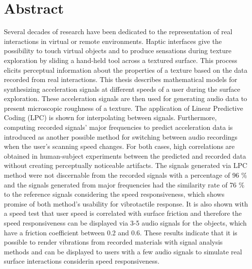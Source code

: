 
\thispagestyle{plain}

\section*{Abstract}


\switchlanguage{\lang} %
Several decades of research have been dedicated to the representation of real interactions in virtual or remote environments. Haptic interfaces give the possibility to touch virtual objects and to produce sensations during texture exploration by sliding a hand-held tool across a textured surface. This process elicits perceptual information about the properties of a texture based on the data recorded from real interactions. This thesis describes mathematical models for synthesizing acceleration signals at different speeds of a user during the surface exploration. These acceleration signals are then used for generating audio data to present microscopic roughness of a texture. The application of Linear Predictive Coding (LPC) is shown for interpolating between signals. Furthermore, computing recorded signals' major frequencies to predict acceleration data is introduced as another possible method for switching between audio recordings when the user's scanning speed changes. For both cases, high correlations are obtained in human-subject experiments between the predicted and recorded data without creating perceptually noticeable artifacts.  The signals generated via LPC method were not discernable from the recorded signals with a percentage of 96 \% and the signals generated from major frequencies had the similarity rate of 76 \% to the reference signals considering the speed responsiveness, which shows promise of both method's usability for vibrotactile response. It is also shown with a speed test that user speed is correlated with surface friction and therefore the speed responsiveness can be displayed via 3-5 audio signals for the objects, which have a friction coefficient between 0.2 and 0.6. These results indicate that it is possible to render vibrations from recorded materials with signal analysis methods and can be displayed to users with a few audio signals to simulate real surface interactions considerin speed responsiveness.






